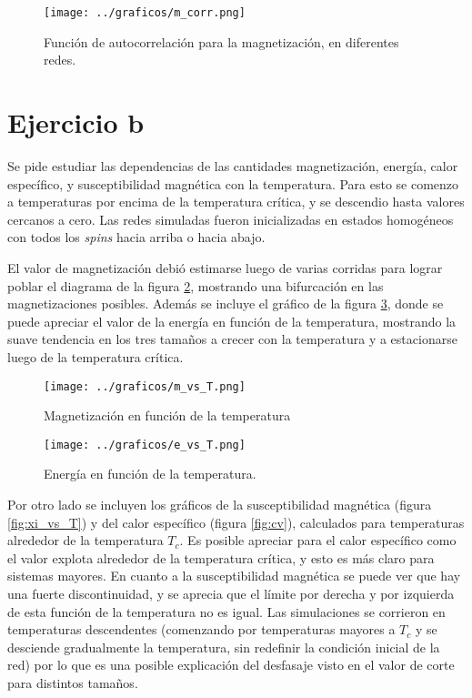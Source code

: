 \documentclass[a4paper,10pt]{paper}
\begin{document}
\begin{figure}[!h]
 \centering
 \texttt{[image: ../graficos/m\_corr.png]}
 \caption{Funci\'on de autocorrelaci\'on para la magnetizaci\'on, en diferentes redes.}
 \label{fig:m_corr}
\end{figure}
\vspace{5cm}

\section{Ejercicio b}
Se pide estudiar las dependencias de las cantidades magnetizaci\'on, energ\'ia, calor espec\'ifico, y
susceptibilidad magn\'etica con la temperatura. Para esto se comenzo a temperaturas por encima de la
temperatura cr\'itica, y se descendio hasta valores cercanos a cero.
Las redes simuladas fueron inicializadas en estados homog\'eneos con todos los \textit{spins} hacia arriba
o hacia abajo.

El valor de magnetizaci\'on debi\'o estimarse luego de varias corridas para lograr poblar el diagrama de la 
figura \ref{fig:m_vs_T}, mostrando una bifurcaci\'on en las magnetizaciones posibles.
Adem\'as se incluye el gr\'afico de la figura \ref{fig:e_vs_T}, donde se puede apreciar el valor de la energ\'ia en
funci\'on de la temperatura, mostrando la suave tendencia en los tres tama\~nos a crecer con la temperatura y a
estacionarse luego de la temperatura cr\'itica.

\begin{figure}[!h]
\centering
 \texttt{[image: ../graficos/m\_vs\_T.png]}
 \caption{Magnetizaci\'on en funci\'on de la temperatura}
 \label{fig:m_vs_T}
\end{figure}

\begin{figure}[!h]
 \centering
 \texttt{[image: ../graficos/e\_vs\_T.png]}
 \caption{Energ\'ia en funci\'on de la temperatura.}
 \label{fig:e_vs_T}
\end{figure}

Por otro lado se incluyen los gr\'aficos de la susceptibilidad magn\'etica (figura \ref{fig:xi_vs_T}) y del calor espec\'ifico
(figura \ref{fig:cv}), calculados para temperaturas alrededor de la temperatura $T_c$. Es posible apreciar para el calor espec\'ifico como
el valor explota alrededor de la temperatura cr\'itica, y esto es m\'as claro para sistemas mayores. En cuanto a la susceptibilidad magn\'etica
se puede ver que hay una fuerte discontinuidad, y se aprecia que el l\'imite por derecha y por izquierda de esta funci\'on de la temperatura no es igual.
Las simulaciones se corrieron en temperaturas descendentes (comenzando por temperaturas mayores a $T_c$ y se desciende gradualmente la temperatura, sin 
redefinir la condici\'on inicial de la red) por lo que es una posible explicaci\'on del desfasaje visto en el valor de corte para distintos tama\~nos.
\end{document}
